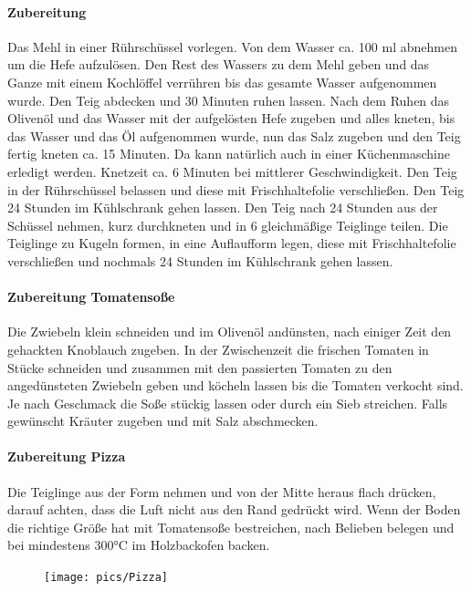 \paragraph{Zubereitung }
Das Mehl in einer Rührschüssel vorlegen. Von dem Wasser ca. 100 ml 
abnehmen um die Hefe aufzulösen. Den Rest des Wassers zu dem Mehl 
geben 
und das Ganze mit einem Kochlöffel verrühren bis das gesamte Wasser 
aufgenommen wurde. Den Teig  abdecken und 30 Minuten ruhen lassen. Nach 
dem Ruhen das Olivenöl und das Wasser mit der aufgelösten Hefe zugeben und 
alles kneten, bis das Wasser und das Öl aufgenommen wurde, nun das Salz 
zugeben und den Teig fertig kneten ca. 15 Minuten. Da kann natürlich auch in 
einer Küchenmaschine erledigt werden. Knetzeit ca. 6 Minuten bei mittlerer 
Geschwindigkeit.
Den Teig in der Rührschüssel belassen und diese mit Frischhaltefolie 
verschließen. Den Teig 24 Stunden im Kühlschrank gehen lassen. Den Teig 
nach 24 Stunden aus der Schüssel nehmen, kurz durchkneten und in 6 
gleichmäßige Teiglinge teilen. Die Teiglinge zu Kugeln formen, in eine 
Auflaufform legen, diese mit Frischhaltefolie verschließen und nochmals 24 
Stunden im Kühlschrank gehen lassen. 

\paragraph{Zubereitung Tomatensoße}
Die Zwiebeln klein schneiden und im Olivenöl andünsten, nach einiger Zeit den 
gehackten Knoblauch zugeben. In der Zwischenzeit die frischen Tomaten in 
Stücke schneiden und zusammen mit den passierten Tomaten zu den 
angedünsteten Zwiebeln geben und köcheln lassen bis die Tomaten verkocht 
sind. Je nach Geschmack die Soße stückig lassen oder durch ein Sieb streichen.
Falls gewünscht Kräuter zugeben und mit Salz abschmecken.

\paragraph{Zubereitung Pizza}
Die Teiglinge aus der Form nehmen und von der Mitte heraus flach drücken, 
darauf achten, dass die Luft nicht aus den Rand gedrückt wird. Wenn der Boden 
die richtige Größe hat mit Tomatensoße bestreichen, nach Belieben belegen 
und bei mindestens 300°C im Holzbackofen backen.
\newpage

\begin{figure}[htbp]
	\centering
	\begin{minipage}{1\textwidth}
		\centering
		\texttt{[image: pics/Pizza]}
		\label{fig:Pizza}
	\end{minipage}
\end{figure}
\newpage


